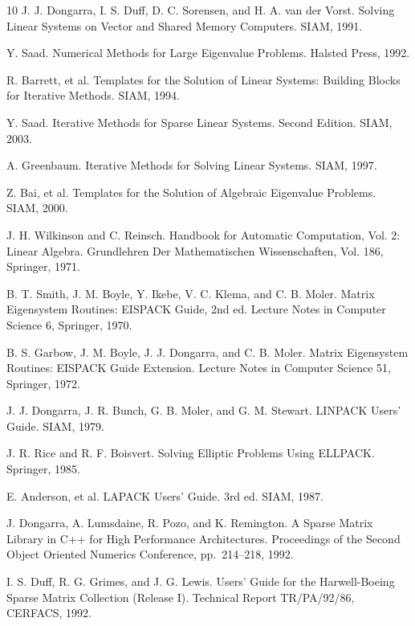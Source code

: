\documentclass[a4paper]{article}
\begin{document}
\begin{thebibliography}{10}
J. J. Dongarra, I. S. Duff, D. C. Sorensen, and H. A. van der Vorst.
\newblock Solving Linear Systems on Vector and Shared Memory Computers.
\newblock SIAM, 1991.

Y. Saad.
\newblock Numerical Methods for Large Eigenvalue Problems. 
\newblock Halsted Press, 1992.

R. Barrett, et al.
\newblock Templates for the Solution of Linear Systems: Building Blocks for Iterative Methods.
\newblock SIAM, 1994.

Y. Saad.
\newblock Iterative Methods for Sparse Linear Systems. Second Edition. 
\newblock SIAM, 2003.

A. Greenbaum.
\newblock Iterative Methods for Solving Linear Systems.
\newblock SIAM, 1997.

Z. Bai, et al.
\newblock Templates for the Solution of Algebraic Eigenvalue Problems.
\newblock SIAM, 2000.

J. H. Wilkinson and C. Reinsch.
\newblock Handbook for Automatic Computation, Vol. 2: Linear Algebra.
\newblock Grundlehren Der Mathematischen Wissenschaften, Vol. 186, Springer, 1971.

B. T. Smith, J. M. Boyle, Y. Ikebe, V. C. Klema, and C. B. Moler.
\newblock Matrix Eigensystem Routines: EISPACK Guide, 2nd ed.
\newblock Lecture Notes in Computer Science 6, Springer, 1970.

B. S. Garbow, J. M. Boyle, J. J. Dongarra, and C. B. Moler.
\newblock Matrix Eigensystem Routines: EISPACK Guide Extension.
\newblock Lecture Notes in Computer Science 51, Springer, 1972.

J. J. Dongarra, J. R. Bunch, G. B. Moler, and G. M. Stewart.
\newblock LINPACK Users' Guide.
\newblock SIAM, 1979.

J. R. Rice and R. F. Boisvert.
\newblock Solving Elliptic Problems Using ELLPACK.
\newblock Springer, 1985.

E. Anderson, et al. 
\newblock LAPACK Users' Guide. 3rd ed.
\newblock SIAM, 1987.

J. Dongarra, A. Lumsdaine, R. Pozo, and K. Remington.
\newblock A Sparse Matrix Library in C++ for High Performance Architectures.
\newblock Proceedings of the Second Object Oriented Numerics Conference,
	pp.\ 214--218, 1992.

I. S. Duff, R. G. Grimes, and J. G. Lewis.
\newblock Users' Guide for the Harwell-Boeing Sparse Matrix Collection
(Release I).
\newblock Technical Report TR/PA/92/86, CERFACS, 1992.


\end{thebibliography}
\end{document}
